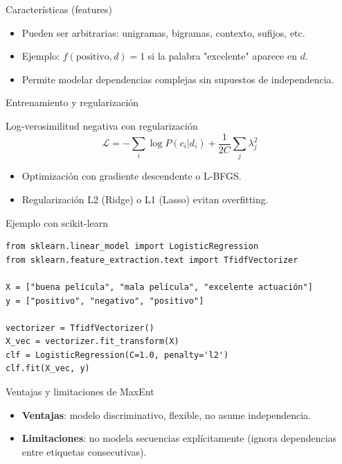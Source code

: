 \documentclass[aspectratio=169, 10pt, xcolor=table]{beamer}
\begin{document}
\begin{frame}{Características (features)}
    \begin{itemize}
        \item Pueden ser arbitrarias: unigramas, bigramas, contexto, sufijos, etc.
        \item Ejemplo: $f(\text{positivo}, d) = 1$ si la palabra "excelente" aparece en $d$.
        \item Permite modelar dependencias complejas sin supuestos de independencia.
    \end{itemize}
\end{frame}

\begin{frame}{Entrenamiento y regularización}
    \begin{block}{Log-verosimilitud negativa con regularización}
        \[
        \mathcal{L} = -\sum_i \log P(c_i|d_i) + \frac{1}{2C}\sum_j \lambda_j^2
        \]
    \end{block}
    \begin{itemize}
        \item Optimización con gradiente descendente o L-BFGS.
        \item Regularización L2 (Ridge) o L1 (Lasso) evitan overfitting.
    \end{itemize}
\end{frame}

\begin{frame}[fragile]{Ejemplo con scikit-learn}
    \begin{lstlisting}
from sklearn.linear_model import LogisticRegression
from sklearn.feature_extraction.text import TfidfVectorizer

X = ["buena película", "mala película", "excelente actuación"]
y = ["positivo", "negativo", "positivo"]

vectorizer = TfidfVectorizer()
X_vec = vectorizer.fit_transform(X)
clf = LogisticRegression(C=1.0, penalty='l2')
clf.fit(X_vec, y)
    \end{lstlisting}
\end{frame}

\begin{frame}{Ventajas y limitaciones de MaxEnt}
    \begin{itemize}
        \item \textbf{Ventajas}: modelo discriminativo, flexible, no asume independencia.
        \item \textbf{Limitaciones}: no modela secuencias explícitamente (ignora dependencias entre etiquetas consecutivas).
    \end{itemize}
\end{frame}
\end{document}
